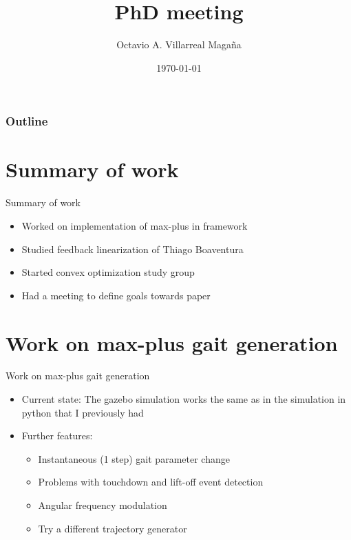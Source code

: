 \documentclass{beamer}
\title[PhD meeting: Planning and Control]{PhD meeting \vspace{15pt}}
\institute[]{Istituto Italiano di Tecnologia, Genova, Italy \vspace{20pt}}
\author{Octavio A. Villarreal Maga\~na \vspace{20pt}} %
\date{\today}
\newcommand*\titleTOC{Outline}
\begin{document}
{
\frame{\titlepage}
\begin{frame}\frametitle{\titleTOC}
	\tableofcontents
\end{frame}
}

{
}


\section{Summary of work}
\begin{frame}{Summary of work}
\begin{itemize}\setlength\itemsep{3em}
\item Worked on implementation of max-plus in framework
\item Studied feedback linearization of Thiago Boaventura
\item Started convex optimization study group
\item Had a meeting to define goals towards paper
\end{itemize}
\end{frame}

\section{Work on max-plus gait generation}

\begin{frame}{Work on max-plus gait generation}
	\begin{itemize}\setlength\itemsep{3em}
		\item Current state: The gazebo simulation works the same as in the simulation in python that I previously had
		\item Further features: 
		\begin{itemize}
		\item Instantaneous (1 step) gait parameter change
		\item Problems with touchdown and lift-off event detection
		\item Angular frequency modulation
		\item Try a different trajectory generator
		\end{itemize}
	\end{itemize}
\end{frame}
\end{document}
